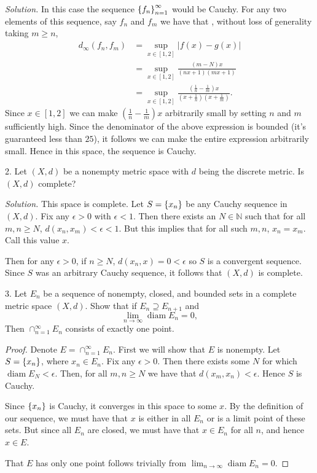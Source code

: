 \documentclass{article}
\DeclareMathOperator{\diam}{diam}
\newcommand{\N}{\mathbb{N}}
\begin{document}
\textit{Solution.}
In this case the sequence $\cbr{f_n}_{n = 1}^\infty$ would be Cauchy.
For any two elements of this sequence, say $f_n$ and $f_m$ we have that
, without loss of generality taking $m \geq n$,
%
\begin{align*}
    d_\infty(f_n, f_m)
        &= \sup_{x \in [1, 2]} |f(x) - g(x)| \\
        &= \sup_{x \in [1, 2]} \frac{(m - N) x}{(n x + 1) (m x + 1)} \\
        &= \sup_{x \in [1, 2]} \frac{(\frac{1}{n} - \frac{1}{m}) x}{(x + \frac{1}{n}) (x + \frac{1}{m})}
    .
\end{align*}
%
Since $x \in [1, 2]$ we can make $(\frac{1}{n} - \frac{1}{m}) x$
arbitrarily small by setting $n$ and $m$ sufficiently high. Since the
denominator of the above expression is bounded (it's guaranteed less
than $25$), it follows we can make the entire expression arbitrarily
small. Hence in this space, the sequence is Cauchy.

\newpage

2. Let $(X, d)$ be a nonempty metric space with $d$ being the discrete
metric. Is $(X, d)$ complete?

\textit{Solution.}
This space is complete. Let $S = \cbr{x_n}$ be any Cauchy sequence in
$(X, d)$. Fix any $\epsilon > 0$ with $\epsilon < 1$. Then there exists
an $N \in \N$ such that for all $m, n \geq N$, $d(x_n, x_m) < \epsilon <
1$. But this implies that for all such $m, n$, $x_n = x_m$. Call this
value $x$.

Then for any $\epsilon > 0$, if $n \geq N$, $d(x_n, x) = 0 < \epsilon$
so $S$ is a convergent sequence. Since $S$ was an arbitrary Cauchy
sequence, it follows that $(X, d)$ is complete.

\newpage

3. Let $E_n$ be a sequence of nonempty, closed, and bounded sets in a
complete metric space $(X, d)$. Show that if $E_n \supseteq E_{n+1}$ and
%
\begin{equation*}
    \lim_{n \to \infty} \diam E_n = 0,
\end{equation*}
%
Then $\cap_{n = 1}^{\infty} E_n$ consists of exactly one point.

\begin{proof}

Denote $E = \cap_{n = 1}^{\infty} E_n$. First we will show that $E$ is
nonempty. Let $S = \cbr{x_n}$, where $x_n \in E_n$. Fix any $\epsilon >
0$. Then there exists some $N$ for which $\diam E_N < \epsilon$. Then,
for all $m, n \geq N$ we have that $d(x_m, x_n) < \epsilon$. Hence $S$
is Cauchy.

Since $\cbr{x_n}$ is Cauchy, it converges in this space to some $x$. By
the definition of our sequence, we must have that $x$ is either in all
$E_n$ or is a limit point of these sets. But since all $E_n$ are closed,
we must have that $x \in E_n$ for all $n$, and hence $x \in E$.

That $E$ has only one point follows trivially from $\lim_{n \to \infty} \diam E_n = 0$.

\end{proof}
\end{document}
